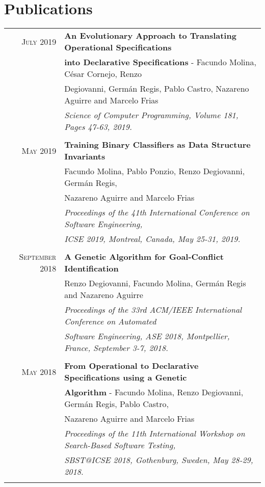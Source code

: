 \documentclass[a4paper,10pt]{article} %
\begin{document}
\section{Publications}
\begin{longtable}{rl}

\textsc{July} 2019  & \textbf{An Evolutionary Approach to Translating Operational Specifications} \\ & \textbf{into Declarative Specifications} - Facundo Molina, César Cornejo, Renzo\\ 
& Degiovanni, Germán Regis, Pablo Castro, Nazareno Aguirre and Marcelo Frias \\
& \textit{Science of Computer Programming, Volume 181, Pages 47-63, 2019.} \\ & \\

\textsc{May} 2019  & \textbf{Training Binary Classifiers as Data Structure Invariants} \\ 
& Facundo Molina, Pablo Ponzio, Renzo Degiovanni, Germán Regis, \\ 
& Nazareno Aguirre and Marcelo Frias \\
& \textit{Proceedings of the 41th International Conference on Software Engineering,} \\
& \textit{ICSE 2019, Montreal, Canada, May 25-31, 2019.} \\ & \\

\textsc{September} 2018  & \textbf{A Genetic Algorithm for Goal-Conflict Identification} \\ 
& Renzo Degiovanni, Facundo Molina, Germán Regis and Nazareno Aguirre \\
& \textit{Proceedings of the 33rd ACM/IEEE International Conference on Automated } \\
& \textit{Software Engineering, ASE 2018, Montpellier, France, September 3-7, 2018.} \\ & \\

\textsc{May} 2018  & \textbf{From Operational to Declarative Specifications using a Genetic} \\ & \textbf{Algorithm} - Facundo Molina, Renzo Degiovanni, Germán Regis, Pablo Castro,\\
& Nazareno Aguirre and Marcelo Frias \\
& \textit{Proceedings of the 11th International Workshop on Search-Based Software Testing,} \\
& \textit{SBST@ICSE 2018, Gothenburg, Sweden, May 28-29, 2018.} \\ & \\


\end{longtable}
\end{document}
